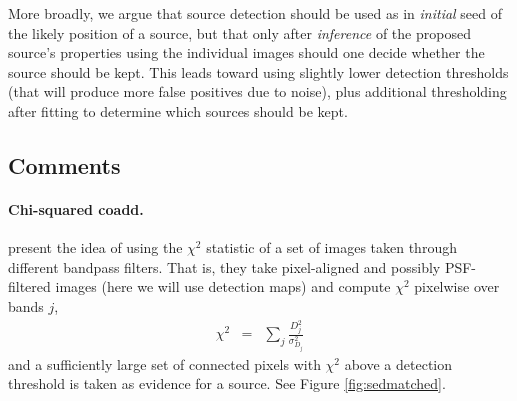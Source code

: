 \documentclass[11pt,letterpaper,linenumbers]{aastex63}
\begin{document}
More broadly, we argue that source detection should be used as in
\emph{initial} seed of the likely position of a source, but that only
after \emph{inference} of the proposed source's properties using the
individual images should one decide whether the source should be kept.
This leads toward using slightly lower detection thresholds (that will
produce more false positives due to noise), plus additional
thresholding after fitting to determine which sources should be kept.


\subsection{Comments}

\paragraph{Chi-squared coadd.}
\cite{szalay1999} present the idea of using the $\chi^2$
statistic of a set of images taken through different bandpass filters.
That is, they take pixel-aligned and possibly PSF-filtered images
(here we will use detection maps) and compute $\chi^2$ pixelwise
over bands $j$,
\begin{eqnarray}
  \chi^2 &=& \sum_j \frac{D_j^2}{\sigma_{D_j}^2}
\end{eqnarray}
and a sufficiently large set of connected pixels with $\chi^2$ above a
detection threshold is taken as evidence for a source.  See Figure
\ref{fig:sedmatched}.
\end{document}

